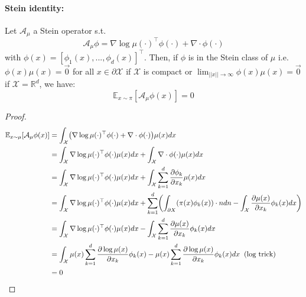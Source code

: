 \documentclass[runningheads,a4paper]{llncs}
\newcommand{\R}{\mathbb{R}}
\newcommand{\E}{\mathbb{E}}
\newcommand{\X}{\mathcal{X}}
\newcommand{\A}{\mathcal{A}}
\newcommand{\diff}[2]{\frac{\partial #1}{\partial #2}}
\DeclarePairedDelimiter{\pare}{(}{)}
\begin{document}
\paragraph{\bf Stein identity:}
Let $\A_\mu$ a Stein operator s.t.
$$
\A_\mu \phi = \nabla \log \mu(\cdot)^\top \phi(\cdot) + \nabla \cdot \phi(\cdot)
$$
with $\phi(x) = [\phi_1(x), ..., \phi_d(x)]^\top$.
Then, if $\phi$ is in the Stein class of $\mu$ i.e. $\phi(x)\mu(x) = \vec{0}$ for all $x \in \partial \X$
if $\X$ is compact or $\lim_{||x|| \to \infty} \phi(x) \mu(x) = \vec{0}$ if $\X = \R^d$, we have:
\begin{equation}
  \E_{x \sim \pi}[\A_\mu \phi (x)] = 0
  \label{eq:stein_id}
\end{equation}
\begin{proof}
  \begin{align*}
    \E_{x \sim \mu}[\A_\mu \phi (x)] &=
      \int_\X \pare*{ \nabla \log \mu(\cdot)^\top \phi(\cdot) + \nabla \cdot \phi(\cdot) } \mu(x) dx \\
    &= \int_\X \nabla \log \mu(\cdot)^\top \phi(\cdot) \mu(x) dx + \int_\X \nabla \cdot \phi(\cdot) \mu(x) dx \\
    &= \int_\X \nabla \log \mu(\cdot)^\top \phi(\cdot) \mu(x) dx +
      \int_\X \sum_{k=1}^d \diff{\phi_k}{x_k} \mu(x) dx \\
    &= \int_\X \nabla \log \mu(\cdot)^\top \phi(\cdot) \mu(x) dx +
    \sum_{k=1}^d \pare*{\int_{\partial X}(\pi(x) \phi_k(x)) \cdot n dn - \int_\X \diff{\mu(x)}{x_k} \phi_k(x) dx} \\
    &= \int_\X \nabla \log \mu(\cdot)^\top \phi(\cdot) \mu(x) dx -
      \int_\X \sum_{k=1}^d \diff{\mu(x)}{x_k} \phi_k(x) dx \\
    &= \int_\X  \mu(x) \sum_{k=1}^d \diff{\log \mu(x)}{x_k}\phi_k(x) -
    \mu(x) \sum_{k=1}^d \diff{\log \mu(x)}{x_k} \phi_k(x) dx \;\; \text{(log trick)} \\
    &= 0
  \end{align*}
\end{proof}
\end{document}
